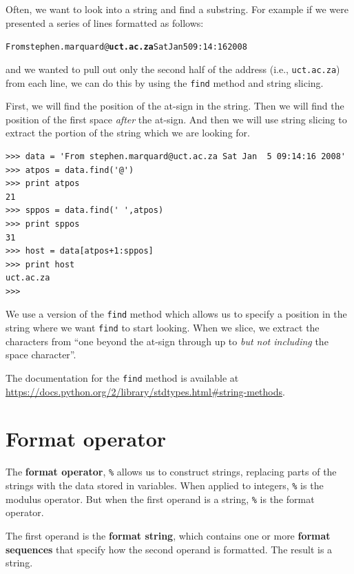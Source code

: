 {Often, we want to look into a string and find a substring.  For example
if we were presented a series of lines formatted as follows:

\beforeverb
\begin{alltt}
From stephen.marquard@{\bf uct.ac.za} Sat Jan  5 09:14:16 2008
\end{alltt}
\afterverb

and we wanted to pull out only the second half of the address (i.e.,
{\tt uct.ac.za}) from each line, we can do this by using the {\tt find}
method and string slicing.   

First, we will find the position of the at-sign in the string.  Then we will
find the position of the first space \emph{after} the at-sign.  And then we
will use string slicing to extract the portion of the string which we 
are looking for.

\beforeverb
\begin{verbatim}
>>> data = 'From stephen.marquard@uct.ac.za Sat Jan  5 09:14:16 2008'
>>> atpos = data.find('@')
>>> print atpos
21
>>> sppos = data.find(' ',atpos)
>>> print sppos
31
>>> host = data[atpos+1:sppos]
>>> print host
uct.ac.za
>>> 
\end{verbatim}
\afterverb
%
We use a version of the {\tt find} method which allows us to specify
a position in the string where we want {\tt find} to start looking.
When we slice, we extract the characters 
from ``one beyond the at-sign through up to \emph{but not including} the 
space character''.  

The documentation for the {\tt find} method is available at
\url{https://docs.python.org/2/library/stdtypes.html#string-methods}.

\section{Format operator}


The {\bf format operator}, {\tt \%}
allows us to construct strings, replacing parts of the strings
with the data stored in variables.
When applied to integers, {\tt \%} is the modulus operator.  But
when the first operand is a string, {\tt \%} is the format operator.


The first operand is the {\bf format string}, which contains
one or more {\bf format sequences} that specify how
the second operand is formatted.  The result is a string.

}
